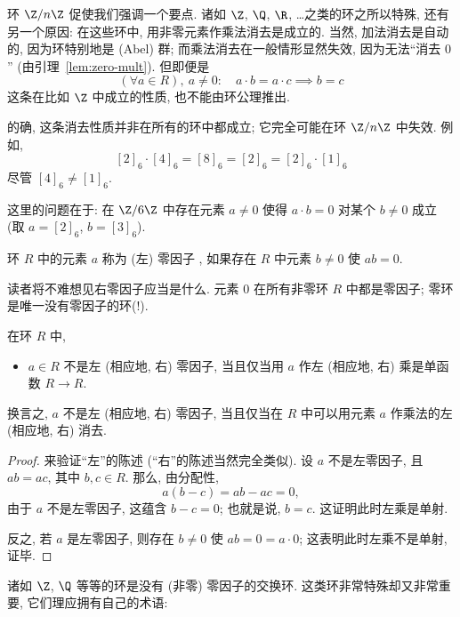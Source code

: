 环 $\Z/n\Z$ 促使我们强调一个要点. 诸如 $\Z$, $\Q$, $\R$, \ldots 之类的环之所以特殊, 还有另一个原因: 在这些环中, 用非零元素作乘法消去是成立的. 当然, 加法消去是自动的, 因为环特别地是 (Abel) 群; 而乘法消去在一般情形显然失效, 因为无法``消去 $0$'' (由引理~\ref{lem:zero-mult}). 但即便是
\[
(\forall a \in R),\ a \neq 0: \quad a \cdot b = a \cdot c \implies b = c
\]
这条在比如 $\Z$ 中成立的性质, 也不能由环公理推出.

的确, 这条消去性质并非在所有的环中都成立; 它完全可能在环 $\Z/n\Z$ 中失效. 例如,
\[
[2]_6 \cdot [4]_6 = [8]_6 = [2]_6 = [2]_6 \cdot [1]_6
\]
尽管 $[4]_6 \neq [1]_6$.

这里的问题在于: 在 $\Z/6\Z$ 中存在元素 $a \neq 0$ 使得 $a \cdot b = 0$ 对某个 $b \neq 0$ 成立 (取 $a = [2]_6$, $b = [3]_6$).

\begin{definition}
\label{def:zero-divisor}
环 $R$ 中的元素 $a$ 称为 (左) 零因子%
, 如果存在 $R$ 中元素 $b \neq 0$ 使 $ab = 0$.
\end{definition}

读者将不难想见右零因子应当是什么. 元素 $0$ 在所有非零环 $R$ 中都是零因子; 零环是唯一没有零因子的环(!).

\begin{proposition}
\label{prop:zero-divisor-injective}
在环 $R$ 中,
\begin{itemize}
	\item $a \in R$ 不是左 (相应地, 右) 零因子, 当且仅当用 $a$ 作左 (相应地, 右) 乘是单函数 $R \to R$.
\end{itemize}
换言之, $a$ 不是左 (相应地, 右) 零因子, 当且仅当在 $R$ 中可以用元素 $a$ 作乘法的左 (相应地, 右) 消去.
\end{proposition}

\begin{proof}
来验证``左''的陈述 (``右''的陈述当然完全类似). 设 $a$ 不是左零因子, 且 $ab = ac$, 其中 $b, c \in R$. 那么, 由分配性,
\[
a(b - c) = ab - ac = 0,
\]
由于 $a$ 不是左零因子, 这蕴含 $b - c = 0$; 也就是说, $b = c$. 这证明此时左乘是单射.

反之, 若 $a$ 是左零因子, 则存在 $b \neq 0$ 使 $ab = 0 = a \cdot 0$; 这表明此时左乘不是单射, 证毕.
\end{proof}

诸如 $\Z$, $\Q$ 等等的环是没有 (非零) 零因子的交换环. 这类环非常特殊却又非常重要, 它们理应拥有自己的术语:

